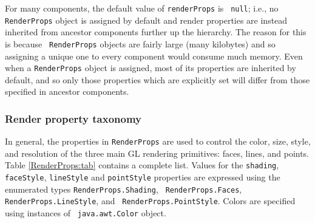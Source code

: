For many components, the default value of {\tt renderProps} is {\tt
null}; i.e., no {\tt RenderProps} object is assigned by default and
render properties are instead inherited from ancestor components
further up the hierarchy. The reason for this is because {\tt
RenderProps} objects are fairly large (many kilobytes) and so
assigning a unique one to every component would consume much
memory. Even when a {\tt RenderProps} object is assigned, most of its
properties are inherited by default, and so only those properties
which are explicitly set will differ from those specified in ancestor
components.

\subsubsection{Render property taxonomy}

In general, the properties in {\tt RenderProps} are used to control
the color, size, style, and resolution of the three main GL rendering
primitives: faces, lines, and points. Table \ref{RenderProps:tab}
contains a complete list. Values for the {\tt shading}, {\tt
faceStyle}, {\tt lineStyle} and {\tt pointStyle} properties are
expressed using the enumerated types {\tt RenderProps.Shading}, {\tt
RenderProps.Faces}, {\tt RenderProps.LineStyle}, and {\tt
RenderProps.PointStyle}.  Colors are specified using instances of {\tt
java.awt.Color} object.


